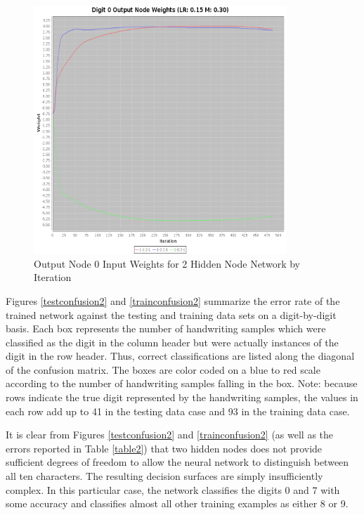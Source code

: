 \documentclass{article}
\begin{document}
\begin{figure}
\centering
\includegraphics[width=0.85\textwidth]{data/final/2_hidden_node_0weight.png}
\caption{Output Node 0 Input Weights for 2 Hidden Node Network by Iteration}
\label{weight2}
\end{figure}

Figures \ref{testconfusion2} and \ref{trainconfusion2} summarize the error rate of the trained network against the testing and training data sets on a digit-by-digit basis. Each box represents the number of handwriting samples which were classified as the digit in the column header but were actually instances of the digit in the row header. Thus, correct classifications are listed along the diagonal of the confusion matrix. The boxes are color coded on a blue to red scale according to the number of handwriting samples falling in the box. Note: because rows indicate the true digit represented by the handwriting samples, the values in each row add up to 41 in the testing data case and 93 in the training data case.

It is clear from Figures \ref{testconfusion2} and \ref{trainconfusion2} (as well as the errors reported in Table \ref{table2}) that two hidden nodes does not provide sufficient degrees of freedom to allow the neural network to distinguish between all ten characters. The resulting decision surfaces are simply insufficiently complex. In this particular case, the network classifies the digits 0 and 7 with some accuracy and classifies almost all other training examples as either 8 or 9.
\end{document}
